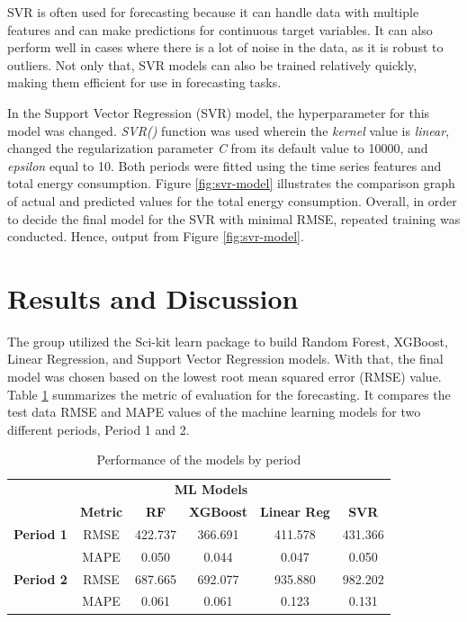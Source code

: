 \documentclass[runningheads]{llncs}
\begin{document}
SVR is often used for forecasting because it can handle data with multiple features and can make predictions for continuous target variables. It can also perform well in cases where there is a lot of noise in the data, as it is robust to outliers. Not only that, SVR models can also be trained relatively quickly, making them efficient for use in forecasting tasks.

In the Support Vector Regression (SVR) model, the hyperparameter for this model was changed. \textit{SVR()} function was used wherein the \textit{kernel} value is \textit{linear}, changed the regularization parameter \textit{C} from its default value to 10000, and \textit{epsilon} equal to 10. Both periods were fitted using the time series features and total energy consumption. Figure \ref{fig:svr-model} illustrates the comparison graph of actual and predicted values for the total energy consumption. Overall, in order to decide the final model for the SVR with minimal RMSE, repeated training was conducted. Hence, output from Figure \ref{fig:svr-model}. 

\section{Results and Discussion}
The group utilized the Sci-kit learn package to build Random Forest, XGBoost, Linear Regression, and Support Vector Regression models. With that, the final model was chosen based on the lowest root mean squared error (RMSE) value. Table \ref{tab:perf} summarizes the metric of evaluation for the forecasting. It compares the test data RMSE and MAPE values of the machine learning models for two different periods, Period 1 and 2.

\begin{center}
\begin{table}[]
    \centering
    \caption{Performance of the models by period}
    \label{tab:perf}
    \begin{tabular}{cccccc}
    \hline
    \multicolumn{4}{r}{\textbf{ML Models}} \\
    \cline{3-6}
      & \textbf{Metric}    & \textbf{RF}    & \textbf{XGBoost}  & \textbf{Linear Reg}    & \textbf{SVR}      \\
    \hline
    \textbf{Period 1}    & RMSE      & 422.737   & 366.691   & 411.578   & 431.366\\
                & MAPE      & 0.050     & 0.044     & 0.047     & 0.050\\
    \hline
    \hline
    \textbf{Period 2}    & RMSE      & 687.665   & 692.077   & 935.880   & 982.202\\
                & MAPE      & 0.061     & 0.061     & 0.123     & 0.131\\
    \hline
    \end{tabular}
\end{table}
\end{center}
\end{document}
